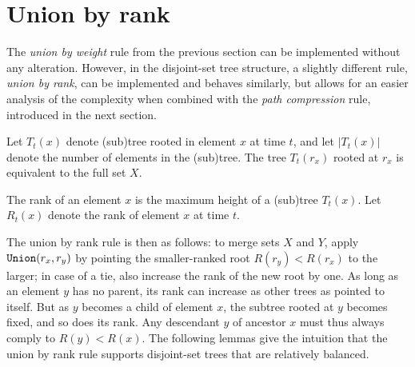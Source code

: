 \section{Union by rank}
The \emph{union by weight} rule from the previous section can be implemented without any alteration. However, in the disjoint-set tree structure, a slightly different rule, \emph{union by rank}, can be implemented and behaves similarly, but allows for an easier analysis of the complexity when combined with the \emph{path compression} rule, introduced in the next section. 

\begin{definition}\label{def:tree}
  Let $T_t(x)$ denote (sub)tree rooted in element $x$ at time $t$, and let $|T_t(x)|$ denote the number of elements in the (sub)tree. The tree $T_t(r_x)$ rooted at $r_x$ is equivalent to the full set $X$.
\end{definition}
\begin{definition}\label{def:rank}
  The rank of an element $x$ is the maximum height of a (sub)tree $T_t(x)$. Let $R_t(x)$ denote the rank of element $x$ at time $t$. 
\end{definition}

The union by rank rule is then as follows: to merge sets $X$ and $Y$, apply $\texttt{Union}(r_x,r_y)$ by pointing the smaller-ranked root $R(r_y) < R(r_x)$ to the larger; in case of a tie, also increase the rank of the new root by one. As long as an element $y$ has no parent, its rank can increase as other trees as pointed to itself. But as $y$ becomes a child of element $x$, the subtree rooted at $y$ becomes fixed, and so does its rank. Any descendant $y$ of ancestor $x$ must thus always comply to $R(y)<R(x)$. The following lemmas give the intuition that the union by rank rule supports disjoint-set trees that are relatively balanced.

